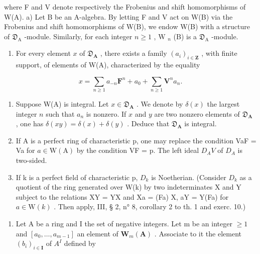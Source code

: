 where F and V denote respectively the Frobenius and shift homomorphisms of W(A). a) Let B be an A-algebra. By letting F and V act on W(B) via the Frobenius and shift homomorphisms of W(B), we endow W(B) with a structure of \(\mathfrak{D}_{\mathrm{A}}\) -module. Similarly, for each integer \(n \geqslant 1\) , W \(_n\) (B) is a \(\mathfrak{D}_{\mathrm{A}}\) -module.

\begin{enumerate}
\def\labelenumi{\alph{enumi})}
\setcounter{enumi}{1}
\tightlist
\item
  For every element \(x\) of \(\mathfrak{D}_{\mathbf{A}}\) , there exists a family \((a_{i})_{i\in\mathbf{Z}}\) , with finite support, of elements of W(A), characterized by the equality
\end{enumerate}

\[
x = \sum_ {n \geqslant 1} a _ {- n} \mathbf {F} ^ {n} + a _ {0} + \sum_ {n \geqslant 1} \mathbf {V} ^ {n} a _ {n}.
\]

\begin{enumerate}
\def\labelenumi{\alph{enumi})}
\setcounter{enumi}{2}
\item
  Suppose W(A) is integral. Let \(x \in \mathfrak{D}_{\mathbf{A}}\) . We denote by \(\delta(x)\) the largest integer \(n\) such that \(a_{n}\) is nonzero. If \(x\) and \(y\) are two nonzero elements of \(\mathfrak{D}_{\mathbf{A}}\) , one has \(\delta(xy) = \delta(x) + \delta(y)\) . Deduce that \(\mathfrak{D}_{\mathbf{A}}\) is integral.
\item
  If A is a perfect ring of characteristic p, one may replace the condition VaF = Va for \(a \in \mathrm{W}(\mathrm{A})\) by the condition VF = p. The left ideal \(D_{A}V\) of \(D_{A}\) is two-sided.
\item
  If k is a perfect field of characteristic p, \(D_{k}\) is Noetherian. (Consider \(D_{k}\) as a quotient of the ring generated over W(k) by two indeterminates X and Y subject to the relations XY = YX and Xa = (Fa) X, aY = Y(Fa) for \(a \in \mathrm{W}(k)\) . Then apply, III, § 2, n° 8, corollary 2 to th. 1 and exerc. 10.)
\end{enumerate}

\begin{enumerate}
\def\labelenumi{\arabic{enumi})}
\setcounter{enumi}{22}
\tightlist
\item
  Let A be a ring and I the set of negative integers. Let m be an integer \(\geqslant 1\) and \([a_{0}, \ldots, a_{m-1}]\) an element of \(\mathbf{W}_{m}(\mathbf{A})\) . Associate to it the element \((b_{i})_{i\in\mathbf{I}}\) of \(A^{I}\) defined by
\end{enumerate}

